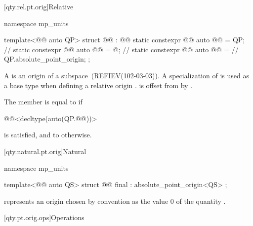 [qty.rel.pt.orig]{Relative}

\begin{codeblock}
namespace mp_units {

template<@@ auto QP>
struct @@ : @@ {
  static constexpr @@ auto @@ = QP;       // \expos
  static constexpr @@ auto @@ = @\seebelownc@;  // \expos
  static constexpr @@ auto @@ =      // \expos
    QP.absolute_point_origin;
};

}
\end{codeblock}

\pnum
A  is an origin
of a subspace~(REFIEV(102-03-03)).
A specialization of  is used as a base type when defining a relative origin .
 is offset from  by .

\pnum
The member  is equal to
 if
\begin{codeblock}
@@<decltype(auto(QP.@@))>
\end{codeblock}
is satisfied, and
to  otherwise.

[qty.natural.pt.orig]{Natural}

\begin{codeblock}
namespace mp_units {

template<@@ auto QS>
struct @@ final : absolute_point_origin<QS> {};

}
\end{codeblock}

\pnum
{} represents an origin
chosen by convention as the value $0$ of the quantity .

[qty.pt.orig.ops]{Operations}

